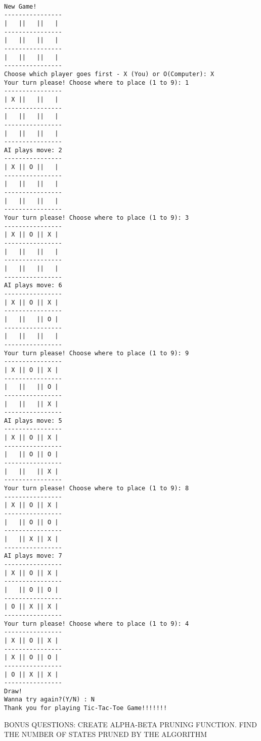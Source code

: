 \documentclass[11pt]{article}
\begin{document}
    \begin{Verbatim}[commandchars=\\\{\}]

New Game!
----------------
|   ||   ||   |
----------------
|   ||   ||   |
----------------
|   ||   ||   |
----------------
Choose which player goes first - X (You) or O(Computer): X
Your turn please! Choose where to place (1 to 9): 1
----------------
| X ||   ||   |
----------------
|   ||   ||   |
----------------
|   ||   ||   |
----------------
AI plays move: 2
----------------
| X || O ||   |
----------------
|   ||   ||   |
----------------
|   ||   ||   |
----------------
Your turn please! Choose where to place (1 to 9): 3
----------------
| X || O || X |
----------------
|   ||   ||   |
----------------
|   ||   ||   |
----------------
AI plays move: 6
----------------
| X || O || X |
----------------
|   ||   || O |
----------------
|   ||   ||   |
----------------
Your turn please! Choose where to place (1 to 9): 9
----------------
| X || O || X |
----------------
|   ||   || O |
----------------
|   ||   || X |
----------------
AI plays move: 5
----------------
| X || O || X |
----------------
|   || O || O |
----------------
|   ||   || X |
----------------
Your turn please! Choose where to place (1 to 9): 8
----------------
| X || O || X |
----------------
|   || O || O |
----------------
|   || X || X |
----------------
AI plays move: 7
----------------
| X || O || X |
----------------
|   || O || O |
----------------
| O || X || X |
----------------
Your turn please! Choose where to place (1 to 9): 4
----------------
| X || O || X |
----------------
| X || O || O |
----------------
| O || X || X |
----------------
Draw!
Wanna try again?(Y/N) : N
Thank you for playing Tic-Tac-Toe Game!!!!!!!
    \end{Verbatim}

    BONUS QUESTIONS: CREATE ALPHA-BETA PRUNING FUNCTION. FIND THE NUMBER OF
STATES PRUNED BY THE ALGORITHM
\end{document}
